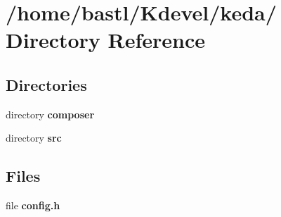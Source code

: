 \section{/home/bastl/Kdevel/keda/ Directory Reference}
\label{dir__2Fhome_2Fbastl_2FKdevel_2Fkeda_2F}
\subsection*{Directories}
\begin{CompactItemize}
\item 
directory {\bf composer}
\item 
directory {\bf src}
\end{CompactItemize}
\subsection*{Files}
\begin{CompactItemize}
\item 
file {\bf config.h}
\end{CompactItemize}
